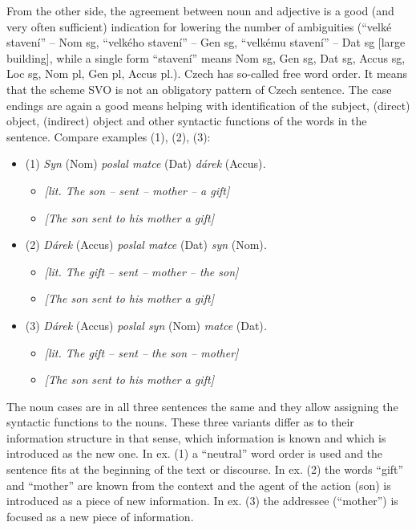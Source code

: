 \begin{multicols}{2}
From the other side, the agreement between noun and adjective is a good (and very often sufficient) indication for lowering the number of ambiguities (“velké stavení” – Nom sg, “velkého stavení” – Gen sg, “velkému stavení” – Dat sg {[}large building{]}, while a single form “stavení” means Nom sg, Gen sg, Dat sg, Accus sg, Loc sg, Nom pl, Gen pl, Accus pl.).
Czech has so-called free word order. It means that the scheme SVO is not an obligatory pattern of Czech sentence. The case endings are again a good means helping with identification of the subject, (direct) object, (indirect) object and other syntactic functions of the words in the sentence. Compare examples (1), (2), (3):
\begin{itemize}
\item[] (1) \textit{Syn} (Nom) \textit{poslal matce} (Dat) \textit{dárek} (Accus)\textit{.}
\begin{itemize}
	\item[] \textit{{[}lit. The son -- sent – mother -- a gift{]}}
	\item[] \textit{{[}The son sent to his mother a gift{]}}
\end{itemize}
\item[]  (2) \textit{Dárek} (Accus) \textit{poslal matce} (Dat) \textit{syn} (Nom)\textit{.}
\begin{itemize}	
	\item[] \textit{{[}lit. The gift -- sent -- mother – the son{]}}
	\item[] \textit{{[}The son sent to his mother a gift{]}}
\end{itemize}
\item[] (3) \textit{Dárek} (Accus) \textit{poslal syn} (Nom) \textit{matce} (Dat)\textit{.}
\begin{itemize}	
	\item[] \textit{{[}lit. The gift – sent – the son – mother{]}}
	\item[] \textit{{[}The son sent to his mother a gift{]}}
\end{itemize}
\end{itemize}
The noun cases are in all three sentences the same and they allow assigning the syntactic functions to the nouns. These three variants differ as to their information structure in that sense, which information is known and which is introduced as the new one. In ex. (1) a “neutral” word order is used and the sentence fits at the beginning of the text or discourse. In ex. (2) the words “gift” and “mother” are known from the context and the agent of the action (son) is introduced as a piece of new information. In ex. (3) the addressee (“mother”) is focused as a new piece of information.

\end{multicols}
